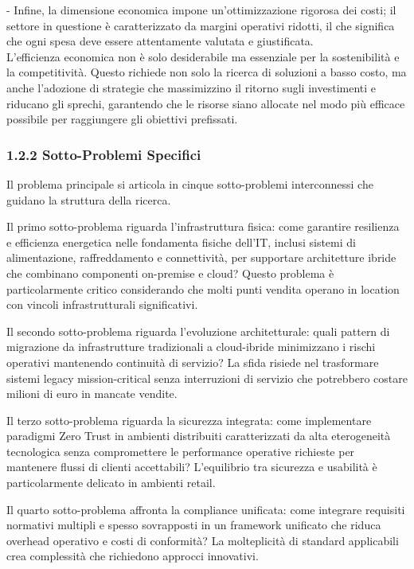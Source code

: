 \documentclass{report}
\begin{document}
- Infine, la dimensione economica impone un'ottimizzazione rigorosa dei
costi; il settore in questione è caratterizzato da margini operativi
ridotti, il che significa che ogni spesa deve essere attentamente
valutata e giustificata.\\
L'efficienza economica non è solo desiderabile ma essenziale per la
sostenibilità e la competitività. Questo richiede non solo la ricerca di
soluzioni a basso costo, ma anche l'adozione di strategie che
massimizzino il ritorno sugli investimenti e riducano gli sprechi,
garantendo che le risorse siano allocate nel modo più efficace possibile
per raggiungere gli obiettivi prefissati.

\subsubsection{\texorpdfstring{\textbf{1.2.2 Sotto-Problemi
Specifici}}{1.2.2 Sotto-Problemi Specifici}}\label{sotto-problemi-specifici}

Il problema principale si articola in cinque sotto-problemi
interconnessi che guidano la struttura della ricerca.

Il primo sotto-problema riguarda l'infrastruttura fisica: come garantire
resilienza e efficienza energetica nelle fondamenta fisiche dell'IT,
inclusi sistemi di alimentazione, raffreddamento e connettività, per
supportare architetture ibride che combinano componenti on-premise e
cloud? Questo problema è particolarmente critico considerando che molti
punti vendita operano in location con vincoli infrastrutturali
significativi.

Il secondo sotto-problema riguarda l'evoluzione architetturale: quali
pattern di migrazione da infrastrutture tradizionali a cloud-ibride
minimizzano i rischi operativi mantenendo continuità di servizio? La
sfida risiede nel trasformare sistemi legacy mission-critical senza
interruzioni di servizio che potrebbero costare milioni di euro in
mancate vendite.

Il terzo sotto-problema riguarda la sicurezza integrata: come
implementare paradigmi Zero Trust in ambienti distribuiti caratterizzati
da alta eterogeneità tecnologica senza compromettere le performance
operative richieste per mantenere flussi di clienti accettabili?
L'equilibrio tra sicurezza e usabilità è particolarmente delicato in
ambienti retail.

Il quarto sotto-problema affronta la compliance unificata: come
integrare requisiti normativi multipli e spesso sovrapposti in un
framework unificato che riduca overhead operativo e costi di conformità?
La molteplicità di standard applicabili crea complessità che richiedono
approcci innovativi.
\end{document}
